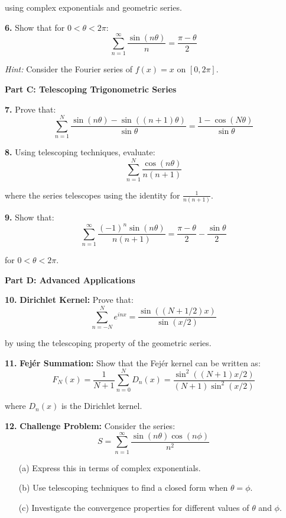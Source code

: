 \documentclass[12pt]{article}
\begin{document}
using complex exponentials and geometric series.
\vspace{4cm}

\textbf{6.} Show that for $0 < \theta < 2\pi$:
$$\sum_{n=1}^{\infty} \frac{\sin(n\theta)}{n} = \frac{\pi - \theta}{2}$$

\textit{Hint:} Consider the Fourier series of $f(x) = x$ on $[0, 2\pi]$.
\vspace{5cm}

\textbf{Part C: Telescoping Trigonometric Series}

\textbf{7.} Prove that:
$$\sum_{n=1}^{N} \frac{\sin(n\theta) - \sin((n+1)\theta)}{\sin\theta} = \frac{1 - \cos(N\theta)}{\sin\theta}$$
\vspace{5cm}

\textbf{8.} Using telescoping techniques, evaluate:
$$\sum_{n=1}^{N} \frac{\cos(n\theta)}{n(n+1)}$$

where the series telescopes using the identity for $\frac{1}{n(n+1)}$.
\vspace{5cm}

\textbf{9.} Show that:
$$\sum_{n=1}^{\infty} \frac{(-1)^n \sin(n\theta)}{n(n+1)} = \frac{\pi - \theta}{2} - \frac{\sin\theta}{2}$$

for $0 < \theta < 2\pi$.
\vspace{5cm}

\textbf{Part D: Advanced Applications}

\textbf{10.} \textbf{Dirichlet Kernel:} Prove that:
$$\sum_{n=-N}^{N} e^{inx} = \frac{\sin((N+1/2)x)}{\sin(x/2)}$$

by using the telescoping property of the geometric series.
\vspace{5cm}

\textbf{11.} \textbf{Fejér Summation:} Show that the Fejér kernel can be written as:
$$F_N(x) = \frac{1}{N+1} \sum_{n=0}^{N} D_n(x) = \frac{\sin^2((N+1)x/2)}{(N+1)\sin^2(x/2)}$$

where $D_n(x)$ is the Dirichlet kernel.
\vspace{5cm}

\textbf{12.} \textbf{Challenge Problem:} Consider the series:
$$S = \sum_{n=1}^{\infty} \frac{\sin(n\theta)\cos(n\phi)}{n^2}$$

\begin{enumerate}
\item[(a)] Express this in terms of complex exponentials.
\vspace{3cm}

\item[(b)] Use telescoping techniques to find a closed form when $\theta = \phi$.
\vspace{4cm}

\item[(c)] Investigate the convergence properties for different values of $\theta$ and $\phi$.
\vspace{3cm}
\end{enumerate}
\end{document}
